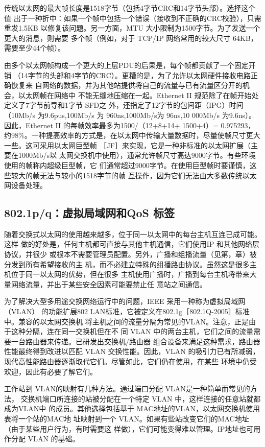 传统以太网的最大帧长度是1518字节（包括4字节CRC和14字节头部）。选择这个值
出于一种折中：如果一个帧中包括一个错误（接收到不正确的CRC校验），只需重发1.5KB
以修复该问题。另一方面，MTU 大小限制为1500字节。为了发送一个更大的消息，则需要
多个帧（例如，对于 TCP/IP 网络常用的较大尺寸 64KB，需要至少44个帧）。

由多个以太网帧构成一个更大的上层PDU的后果是，每个帧都贡献了一个固定开销
（14字节的头部和4字节的CRC）。更糟的是，为了允许以太网硬件接收电路正确恢复来
自网络的数据，并为其他站提供将自己的流量与已有流量区分开的机会，以太网帧在网络中
不能无缝地压缩在一起。Ethernet II 规范除了在帧开始处定义了7字节前导和1字节 SFD之
外，还指定了12字节的包间距（IPG）时间（10Mb/s 为9.6pus,100Mb/s 为 960ns,1000Mb/s为
96ns,10 000Mb/s 为9.6ns）。因此，Ethernet II 的每帧效率最多为1500/（12+8+14+ 1500+4）=
0.975293，约98\%。一种提高效率的方式是，在以太网中传输大量数据时，尽量使帧尺寸更大
一些。这可采用以太网巨型帧 ［JF］来实现，它是一种非标准的以太网扩展（主要在1000Mb/s以
太网交换机中使用），通常允许帧尺寸高达9000字节。有些环境使用的帧称内超级巨型帧，它
们通常超过9000字节。在使用巨型帧时要谨慎，这些较大的帧无法与较小的1518字节的帧
互操作，因为它们无法由大多数传统以太网设备处理。

\subsection{802.1p/q：虚拟局域网和QoS 标签}

随着交换式以太网的使用越来越多，位于同一以太网中的每台主机互连已成可能。这样
做的好处是，任何主机都可直接与其他主机通信，它们使用IP 和其他网络层协议，并很少
或根本不需要管理员配置。另外，广播和组播流量（见第，章）被分发到所有希望接收的主
机，而不必建立特殊的组播路由协议。虽然这是很多主机位于同一以太网的优势，但在很多
主机使用广播时，广播到每台主机将带来大量网络流量，并出于某些安全因素可能要禁止任
意站之间通信。

为了解决大型多用途交换网络运行中的问题，IEEE 采用一种称为虚拟局域网（VLAN）
的功能扩展802 LAN标准，它被定义在802.1g［802.1Q-2005］标准中。兼容的以太网交换机
将主机之间的流量分隔为常见的VLAN。注意，正是由于这种分隔，连在同一交换机但在不
同 VLAN 中的两台主机，它们之间的流量需要一台路由器来传递。已研发出交换机/路由器
组合设备来满足这种需求，路由器性能最终得到改进以匹配 VLAN 交换性能。因此，VLAN
的吸引力已有所减弱，现代高性能路由器逐渐取代它们。尽管如此，它们仍在使用，在某些
环境中仍受欢迎，因此有必要了解它们。

工作站到 VLAN的映射有几种方法。通过端口分配 VLAN是一种简单而常见的方法，
交换机端口所连接的站被分配在一个特定 VLAN 中，这样连接的任意站就都成为VLAN中
的成员。其他选择包括基于 MAC地址的VLAN，以太网交换机使用表将一个站的MAC地
址映射到一个 VLAN。如果有些站改变它们的MAC地址（由于某些用户行为，有时需要这
样做），它们可能变得难以管理。IP地址也可用作分配 VLAN 的基础。

